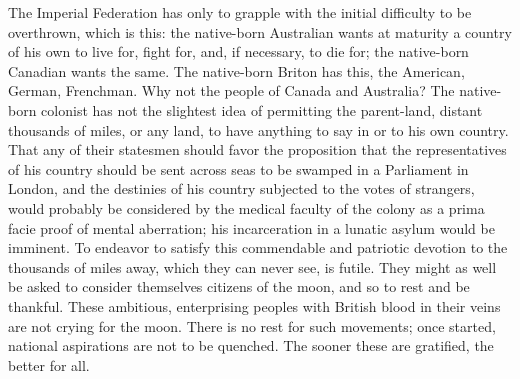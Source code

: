 \documentclass[11pt,openany]{book}
\begin{document}
The Imperial Federation has only to grapple with the initial difficulty to be overthrown, which is this: the native-born Australian wants at maturity a country of his own to live for, fight for, and, if necessary, to die for; the native-born Canadian wants the same. The native-born Briton has this, the American, German, Frenchman. Why not the people of Canada and Australia? The native-born colonist has not the slightest idea of permitting the parent-land, distant thousands of miles, or any land, to have anything to say in or to his own country. That any of their statesmen should favor the proposition that the representatives of his country should be sent across seas to be swamped in a Parliament in London, and the destinies of his country subjected to the votes of strangers, would probably be considered by the medical faculty of the colony as a prima facie proof of mental aberration; his incarceration in a lunatic asylum would be imminent. To endeavor to satisfy this commendable and patriotic devotion to the thousands of miles away, which they can never see, is futile. They might as well be asked to consider themselves citizens of the moon, and so to rest and be thankful. These ambitious, enterprising peoples with British blood in their veins are not crying for the moon. There is no rest for such movements; once started, national aspirations are not to be quenched. The sooner these are gratified, the better for all.
\end{document}
